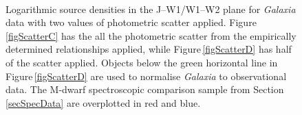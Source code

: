 \begin{figure}[!ht]
    \centering
    \\
    \caption{Logarithmic source densities in the J--W1/W1--W2 plane for {\em Galaxia} data with two values of photometric scatter applied. Figure\,\ref{figScatterC} has the all the photometric scatter from the empirically determined relationships applied, while Figure\,\ref{figScatterD} has half of the scatter applied. Objects below the green horizontal line in Figure\,\ref{figScatterD} are used to normalise  {\em Galaxia} to observational data. The M-dwarf spectroscopic comparison sample from Section\,\ref{secSpecData} are overplotted in red and blue.} 
    \label{figPhotoScatter}
\end{figure}

